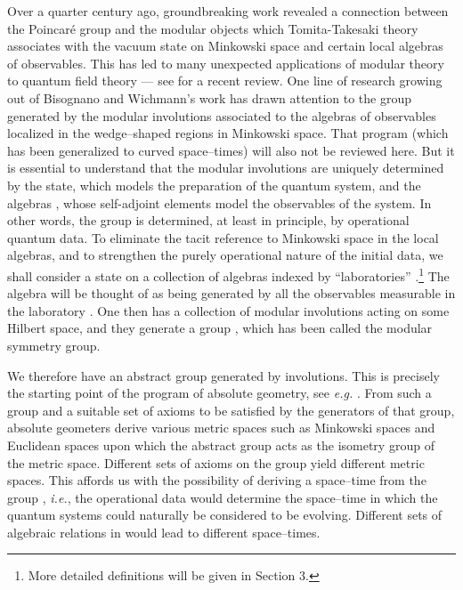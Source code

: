 \documentclass[a4paper,twoside,12pt]{article}
\def\inet{{\{\As_i \}_{i \in I}}}
\def\As{{\cal A}}
\def\Js{{\cal J}}
\begin{document}
     Over a quarter century ago, groundbreaking work \cite{BW}
revealed a connection between the Poincar\'e group and the modular
objects which Tomita-Takesaki theory \cite{Tak,BR,KR} associates with
the vacuum state on Minkowski space and certain local algebras of
observables. This has led to many unexpected applications of modular
theory to quantum field theory --- see \cite{Bor} for a recent
review. One line of research \cite{BS,Sum,BFS1,BDFS,BS2} growing out of
Bisognano and Wichmann's work has drawn attention to the group \myHighlight{$\Js$}\coordHE{}
generated by the modular involutions \coordHE{} associated to the algebras
of observables \myHighlight{$\As(W)$}\coordHE{} localized in the wedge--shaped regions \coordHE{} in
Minkowski space. That program (which has been generalized to curved
space--times) will also not be reviewed here. But it is essential to
understand that the modular involutions \coordHE{} are uniquely determined
by the state, which models the preparation of the quantum system, and
the algebras \myHighlight{$\As(W)$}\coordHE{}, whose self-adjoint elements model the
observables of the system. In other words, the group \myHighlight{$\Js$}\coordHE{} is
determined, at least in principle, by operational quantum data. To
eliminate the tacit reference to Minkowski space in the local
algebras, and to strengthen the purely operational nature of the
initial data, we shall consider a state \myHighlight{$\omega$}\coordHE{} on a collection \myHighlight{$\inet$}\coordHE{} 
of algebras \myHighlight{$\As_i$}\coordHE{} indexed by ``laboratories''
\coordHE{}.\footnote{More detailed definitions will be given in Section
3.} The algebra \myHighlight{$\As_i$}\coordHE{} will be thought of as being generated by all
the observables measurable in the laboratory \coordHE{}. One then has a
collection of modular involutions \coordHE{} acting on some Hilbert space,
and they generate a group \myHighlight{$\Js$}\coordHE{}, which has been called the modular
symmetry group.

     We therefore have an abstract group \myHighlight{$\Js$}\coordHE{} generated by
involutions.  This is precisely the starting point of the program of
absolute geometry, see {\it e.g.} \cite{Ah,Ba,BBPW}. From such a group
and a suitable set of axioms to be satisfied by the generators of that
group, absolute geometers derive various metric spaces such as
Minkowski spaces and Euclidean spaces upon which the abstract group
acts as the isometry group of the metric space. Different sets of
axioms on the group yield different metric spaces. This affords us with
the possibility of deriving a space--time from the group \myHighlight{$\Js$}\coordHE{}, 
{\it i.e.}, the operational data \myHighlight{$(\omega,\inet)$}\coordHE{} 
would determine the space--time in which the quantum systems could 
naturally be considered to be evolving. Different sets of algebraic
relations in \myHighlight{$\Js$}\coordHE{} would lead to different space--times.
\end{document}
